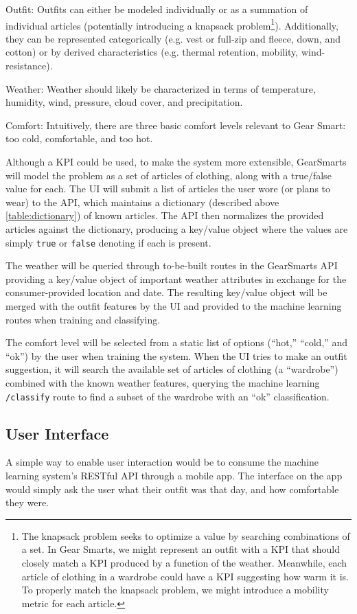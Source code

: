 \begin{description}
  \item{Outfit:} Outfits can either be modeled individually or as a summation of individual articles (potentially introducing
  a knapsack problem\footnote{The knapsack problem seeks to optimize a value by searching combinations of a set. In Gear Smarts,
  we might represent an outfit with a KPI that should closely match a KPI produced by a function of the weather. Meanwhile, each
  article of clothing in a wardrobe could have a KPI suggesting how warm it is. To properly match the knapsack problem, we might
  introduce a mobility metric for each article.}).
  Additionally, they can be represented categorically (e.g. vest or full-zip and
  fleece, down, and cotton) or by derived characteristics (e.g. thermal retention, mobility, wind-resistance).
  \item{Weather:} Weather should likely be characterized in terms of temperature, humidity, wind, pressure,
  cloud cover, and precipitation.
  \item{Comfort:} Intuitively, there are three basic comfort levels relevant to Gear Smart: too cold, comfortable, and too hot.
\end{description}

Although a KPI could be used, to make the system more extensible, GearSmarts will model the problem as a set of
articles of clothing, along with a true/false value for each. The UI will submit a list of articles the user wore (or
plans to wear) to the API, which maintains a dictionary (described above \ref{table:dictionary}) of known articles. The
API then normalizes the provided articles against the dictionary, producing a key/value object where the values are
simply \texttt{true} or \texttt{false} denoting if each is present.

The weather will be queried through to-be-built routes in the GearSmarts API providing a key/value object of important
weather attributes in exchange for the consumer-provided location and date. The resulting key/value object will be
merged with the outfit features by the UI and provided to the machine learning routes when training and classifying.

The comfort level will be selected from a static list of options (``hot,'' ``cold,'' and ``ok'') by the user when
training the system. When the UI tries to make an outfit suggestion, it will search the available set of articles of
clothing (a ``wardrobe'') combined with the known weather features, querying the machine learning \texttt{/classify}
route to find a subset of the wardrobe with an ``ok'' classification.


\subsection{User Interface}
A simple way to enable user interaction would be to consume the machine learning system's RESTful API through a
mobile app. The interface on the app would simply ask the user what their outfit was that day, and how comfortable
they were.
